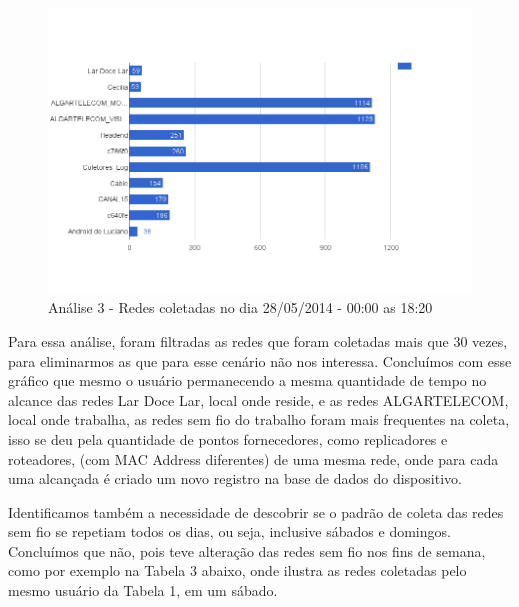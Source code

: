 \documentclass[12pt, %
openright, 
oneside,
a4paper,
brazil]{facom-ufu-abntex2}
\begin{document}
\begin{figure}[hbt]
  \includegraphics[scale=0.4]{analise3}
  \caption{Análise 3 - Redes coletadas no dia 28/05/2014 - 00:00 as 18:20}
\end{figure}


Para essa análise, foram filtradas as redes que foram coletadas mais que 30 vezes, para eliminarmos as que para esse cenário não nos interessa. Concluímos com esse gráfico que mesmo o usuário permanecendo a mesma quantidade de tempo no alcance das redes Lar Doce Lar, local onde reside,  e as redes ALGARTELECOM, local onde trabalha, as redes sem fio do trabalho foram mais frequentes na coleta, isso se deu pela quantidade de pontos fornecedores, como replicadores e roteadores, (com MAC Address diferentes) de uma mesma rede, onde para cada uma alcançada é criado um novo registro na base de dados do dispositivo. 

Identificamos também a necessidade de descobrir se o padrão de coleta das redes sem fio se repetiam todos os dias, ou seja, inclusive sábados e domingos. Concluímos que não, pois teve alteração das redes sem fio nos fins de semana,  como por exemplo na Tabela 3 abaixo, onde ilustra as redes coletadas pelo mesmo usuário da Tabela 1, em um sábado.
\end{document}
